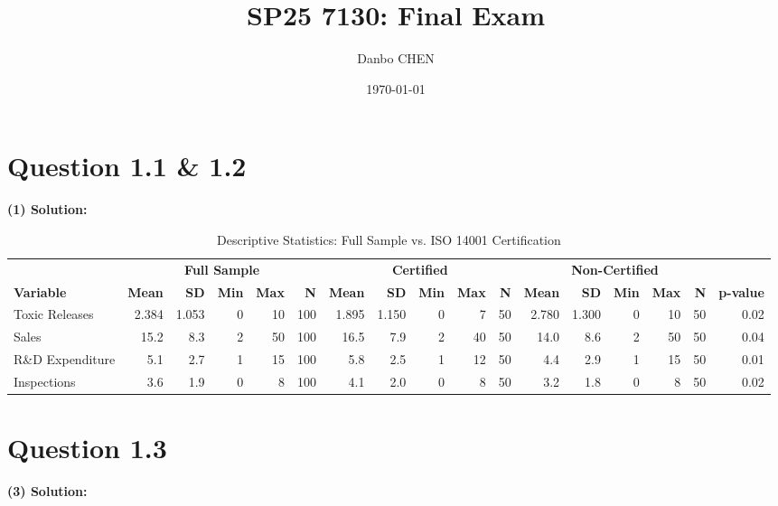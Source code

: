 \documentclass[10pt, oneside]{article}
\title{SP25 7130: Final Exam}
\author{Danbo CHEN}
\date{\today}
\begin{document}
\maketitle
\vspace{.25in}

\section{Question 1.1 \& 1.2}
\textbf{(1) Solution:}
\begin{table}[htbp]
    \centering
    \caption{Descriptive Statistics: Full Sample vs. ISO 14001 Certification}
    \label{tab:desc_stats}
    \begin{tabular}{lrrrrrrrrrrrrrrrr}
        \toprule
        & \multicolumn{5}{c}{\textbf{Full Sample}} 
        & \multicolumn{5}{c}{\textbf{Certified}} 
        & \multicolumn{5}{c}{\textbf{Non-Certified}} 
        & \\
        \cmidrule(lr){2-6}\cmidrule(lr){7-11}\cmidrule(lr){12-16}
        \textbf{Variable} 
        & \textbf{Mean} & \textbf{SD} & \textbf{Min} & \textbf{Max} & \textbf{N} 
        & \textbf{Mean} & \textbf{SD} & \textbf{Min} & \textbf{Max} & \textbf{N} 
        & \textbf{Mean} & \textbf{SD} & \textbf{Min} & \textbf{Max} & \textbf{N} 
        & \textbf{p-value} \\
        \midrule
        Toxic Releases 
        & 2.384 & 1.053 & 0 & 10 & 100 
        & 1.895 & 1.150 & 0 & 7  & 50 
        & 2.780 & 1.300 & 0 & 10 & 50 
        & 0.02 \\
        Sales
        & 15.2  & 8.3   & 2 & 50 & 100
        & 16.5  & 7.9   & 2 & 40 & 50
        & 14.0  & 8.6   & 2 & 50 & 50
        & 0.04 \\
        R\&D Expenditure
        & 5.1   & 2.7   & 1 & 15 & 100
        & 5.8   & 2.5   & 1 & 12 & 50
        & 4.4   & 2.9   & 1 & 15 & 50
        & 0.01 \\
        Inspections
        & 3.6   & 1.9   & 0 & 8  & 100
        & 4.1   & 2.0   & 0 & 8  & 50
        & 3.2   & 1.8   & 0 & 8  & 50
        & 0.02 \\
        \bottomrule
    \end{tabular}
\end{table}
  

\section{Question 1.3}
\textbf{(3) Solution:}
\end{document}
